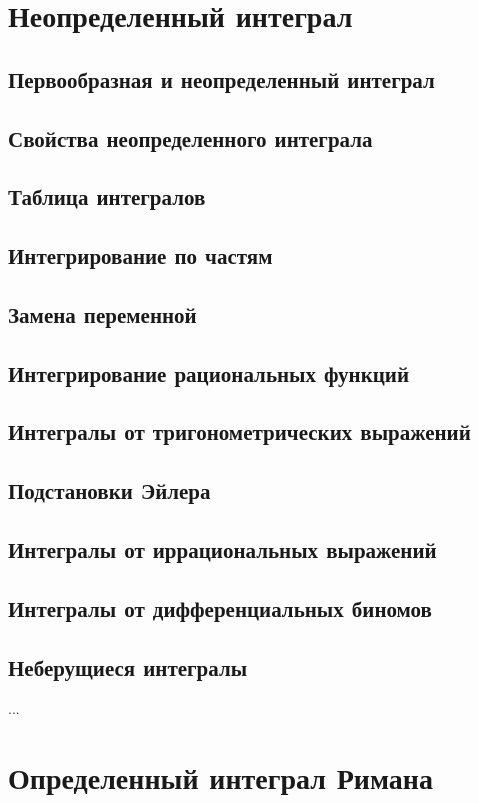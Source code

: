 \section{Неопределенный интеграл}
\subsection{Первообразная и неопределенный интеграл}
\subsection{Свойства неопределенного интеграла}
\subsection{Таблица интегралов}
\subsection{Интегрирование по частям}
\subsection{Замена переменной}
\subsection{Интегрирование рациональных функций}
\subsection{Интегралы от тригонометрических выражений}
\subsection{Подстановки Эйлера}
\subsection{Интегралы от иррациональных выражений}
\subsection{Интегралы от дифференциальных биномов} 
\subsection{Неберущиеся интегралы}
...

\section{Определенный интеграл Римана}
